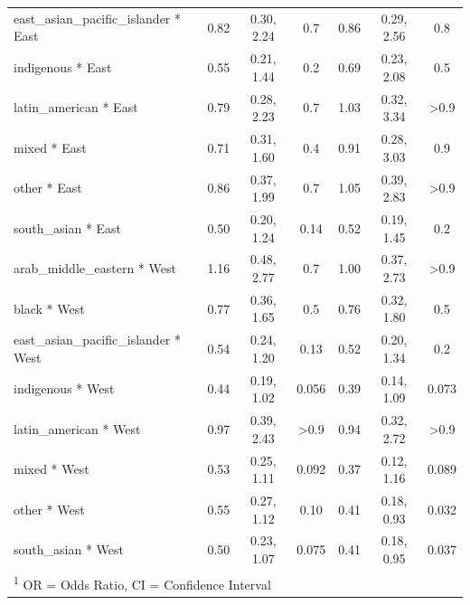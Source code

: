 \documentclass[
  letterpaper,
  DIV=11,
  numbers=noendperiod]{scrartcl}
\begin{document}
\begin{longtable}{lcccccc}
\hspace{1em}east\_asian\_pacific\_islander * East & 0.82 & 0.30, 2.24 & 0.7 & 0.86 & 0.29, 2.56 & 0.8\\
\hspace{1em}indigenous * East & 0.55 & 0.21, 1.44 & 0.2 & 0.69 & 0.23, 2.08 & 0.5\\
\hspace{1em}latin\_american * East & 0.79 & 0.28, 2.23 & 0.7 & 1.03 & 0.32, 3.34 & >0.9\\
\hspace{1em}mixed * East & 0.71 & 0.31, 1.60 & 0.4 & 0.91 & 0.28, 3.03 & 0.9\\
\hspace{1em}other * East & 0.86 & 0.37, 1.99 & 0.7 & 1.05 & 0.39, 2.83 & >0.9\\
\hspace{1em}south\_asian * East & 0.50 & 0.20, 1.24 & 0.14 & 0.52 & 0.19, 1.45 & 0.2\\
\hspace{1em}arab\_middle\_eastern * West & 1.16 & 0.48, 2.77 & 0.7 & 1.00 & 0.37, 2.73 & >0.9\\
\hspace{1em}black * West & 0.77 & 0.36, 1.65 & 0.5 & 0.76 & 0.32, 1.80 & 0.5\\
\hspace{1em}east\_asian\_pacific\_islander * West & 0.54 & 0.24, 1.20 & 0.13 & 0.52 & 0.20, 1.34 & 0.2\\
\hspace{1em}indigenous * West & 0.44 & 0.19, 1.02 & 0.056 & 0.39 & 0.14, 1.09 & 0.073\\
\hspace{1em}latin\_american * West & 0.97 & 0.39, 2.43 & >0.9 & 0.94 & 0.32, 2.72 & >0.9\\
\hspace{1em}mixed * West & 0.53 & 0.25, 1.11 & 0.092 & 0.37 & 0.12, 1.16 & 0.089\\
\hspace{1em}other * West & 0.55 & 0.27, 1.12 & 0.10 & 0.41 & 0.18, 0.93 & 0.032\\
\hspace{1em}south\_asian * West & 0.50 & 0.23, 1.07 & 0.075 & 0.41 & 0.18, 0.95 & 0.037\\*
\multicolumn{7}{l}{\rule{0pt}{1em}\textsuperscript{1} OR = Odds Ratio, CI = Confidence Interval}\\
\end{longtable}

\normalsize
\end{document}
